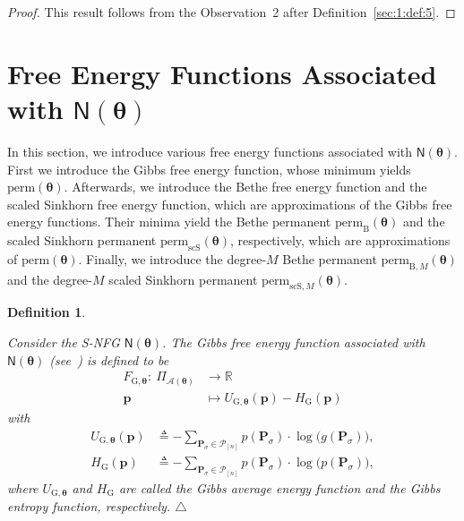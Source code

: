 \documentclass[journal,lettersize,twocolumn]{IEEEtran} %
\newtheorem{definition}[theorem]{Definition}
\newcommand{\edefinition}{\hfill$\triangle$}
\newcommand{\set}[1]{\mathcal{#1}}
\newcommand{\sfN}{ \mathsf{N} }
\newcommand{\sR}{\mathbb{R}}
\newcommand{\matr}[1]{ \bm{#1} }
\newcommand{\defeq}{ \triangleq }
\newcommand{\perm}{ \mathrm{perm} }
\newcommand{\permb}{ \mathrm{perm}_{\mathrm{B}} }
\newcommand{\permbM}[1]{\perm_{ \mathrm{B}, #1 }}
\newcommand{\permscs}{ \mathrm{perm}_{\mathrm{scS}} }
\newcommand{\permscsM}[1]{ \mathrm{perm}_{\mathrm{scS},#1} }
\newcommand{\setP}{\set{P}}
\newcommand{\mtheta}{\matr{\theta}}
\newcommand{\mP}{\matr{P}}
\newcommand{\setA}{ \set{A} }
\newcommand{\HG}{H_{ \mathrm{G} }}
\newcommand{\FGthe}{F_{ \mathrm{G}, \mtheta }}
\newcommand{\UGthe}{U_{ \mathrm{G}, \mtheta }}
\newcommand{\vp}{\bm{p} }
\newcommand{\PiA}[1]{ \Pi_{\setA(#1)} }
\begin{document}
%

\begin{proof}
  This result follows from the Observation~2 after
  Definition~\ref{sec:1:def:5}.
\end{proof}

%
%

\ifx\withclearpagecommands\x
\clearpage
\fi

\section{Free Energy Functions Associated with 
               \texorpdfstring{$\sfN(\mtheta)$}{}}
\label{sec:free:energy:functions:1}

%

In this section, we introduce various free energy functions associated with
$\sfN(\mtheta)$. First we introduce the Gibbs free energy function, whose
minimum yields $\perm(\mtheta)$. Afterwards, we introduce the Bethe free
energy function and the scaled Sinkhorn free energy function, which are
approximations of the Gibbs free energy functions. Their minima yield the
Bethe permanent $\permb(\mtheta)$ and the scaled Sinkhorn permanent
$\permscs(\mtheta)$, respectively, which are approximations of
$\perm(\mtheta)$. Finally, we introduce the degree-$M$ Bethe permanent
$\permbM{M}(\mtheta)$ and the degree-$M$ scaled Sinkhorn permanent
$\permscsM{M}(\mtheta)$.

%

\begin{definition}
  \label{sec:1:def:18}

  Consider the S-NFG $ \sfN(\mtheta) $. The Gibbs free energy function
  associated with $ \sfN(\mtheta) $ (see~\cite[Section III]{Yedidia2005}) is
  defined to be
  \begin{align*}
    \FGthe: \ \PiA{\mtheta} &\to \sR \\
              \vp           &\mapsto \UGthe(\vp) - \HG(\vp)
  \end{align*}
  with
  \begin{align*}
    \UGthe(\vp)   
      &\defeq 
         - 
         \sum_{\mP_{\sigma} \in \setP_{[n]}}
           p( \mP_{\sigma} ) \cdot \log \bigl( g( \mP_{\sigma} ) \bigr), \\
    \HG(\vp)   
      &\defeq 
         - 
         \sum_{\mP_{\sigma} \in \setP_{[n]}} 
           p( \mP_{\sigma} ) \cdot \log \bigl( p( \mP_{\sigma} ) \bigr),
  \end{align*}
  where $ \UGthe $ and $ \HG $ are called the Gibbs average
  energy function and the Gibbs entropy function, respectively.
  \edefinition
\end{definition}
\end{document}
